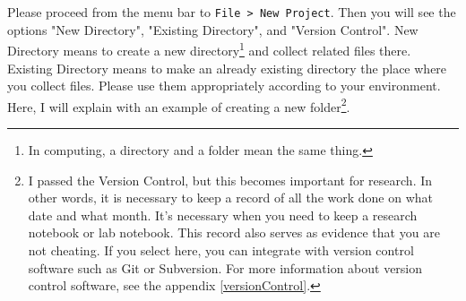 \documentclass{ltjsbook}
\begin{document}
Please proceed from the menu bar to \verb|File > New Project|. Then you will see the options "New Directory", "Existing Directory", and "Version Control". New Directory means to create a new directory\footnote{In computing, a directory and a folder mean the same thing.} and collect related files there. Existing Directory means to make an already existing directory the place where you collect files. Please use them appropriately according to your environment. Here, I will explain with an example of creating a new folder\footnote{ I passed the Version Control, but this becomes important for research. In other words, it is necessary to keep a record of all the work done on what date and what month. It's necessary when you need to keep a research notebook or lab notebook. This record also serves as evidence that you are not cheating. If you select here, you can integrate with version control software such as Git or Subversion. For more information about version control software, see the appendix \ref{versionControl}.}.



\end{document}
